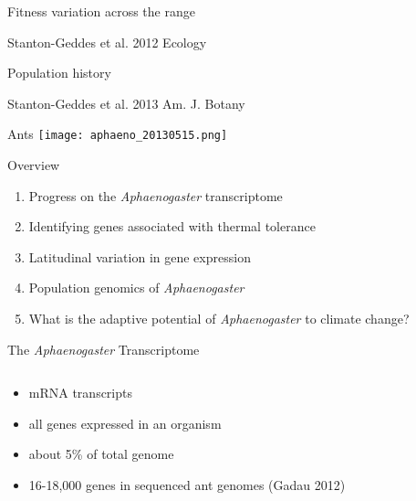 \documentclass{beamer}
\begin{document}
\begin{frame}{Fitness variation across the range}
	\begin{center}
	\end{center}
	\tiny{Stanton-Geddes et al. 2012 Ecology}
\end{frame}

\begin{frame}{Population history}
	\begin{center}
	\end{center}	
	\tiny{Stanton-Geddes et al. 2013 Am. J. Botany}
\end{frame}

\begin{frame}{Ants}
		\texttt{[image: aphaeno\_20130515.png]}
\end{frame}

\begin{frame}{Overview}
  \begin{enumerate}
  	\item<1-| alert@1>Progress on the \textit{Aphaenogaster} transcriptome
  	\item Identifying genes associated with thermal tolerance
	\item Latitudinal variation in gene expression
  	\item Population genomics of \textit{Aphaenogaster}
  	\item What is the adaptive potential of \textit{Aphaenogaster} to climate change?
  \end{enumerate}
\end{frame}


\begin{frame}{The \textit{Aphaenogaster }Transcriptome}
	\begin{columns}
		\begin{column}{5cm}
			\begin{itemize}
				\item mRNA transcripts
				\item all genes expressed in an organism
				\item about 5\% of total genome
				\item 16-18,000 genes in sequenced ant genomes (Gadau 2012)
			\end{itemize}
		\end{column}
		\begin{column}{5cm}
			\begin{center}
			\end{center}
		\end{column}
	\end{columns}
\end{frame}
\end{document}
